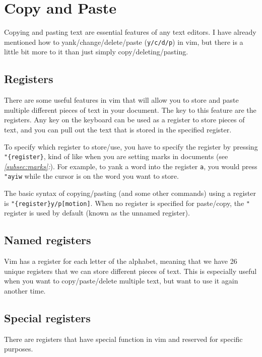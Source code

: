 \chapter{Copy and Paste}

Copying and pasting text are essential features of any text editors.
I have already mentioned how to yank/change/delete/paste (\verb|y/c/d/p|) in vim, but there is a little bit more to it than just simply copy/deleting/pasting.

\section{Registers}

There are some useful features in vim that will allow you to store and paste multiple different pieces of text in your document.
The key to this feature are the registers.
Any key on the keyboard can be used as a register to store pieces of text, and you can pull out the text that is stored in the specified register.

To specify which register to store/use, you have to specify the register by pressing \verb|"{register}|, kind of like when you are setting marks in documents (see \textit{\ref{subsec:marks}:}).
For example, to yank a word into the register \verb|a|, you would press \verb|"ayiw| while the cursor is on the word you want to store.

The basic syntax of copying/pasting (and some other commands) using a register is \verb|"{register}y/p[motion]|.
When no register is specified for paste/copy, the \verb|"| register is used by default (known as the unnamed register).

\section{Named registers}

Vim has a register for each letter of the alphabet, meaning that we have 26 unique registers that we can store different pieces of text.
This is especially useful when you want to copy/paste/delete multiple text, but want to use it again another time.

\section{Special registers}

There are registers that have special function in vim and reserved for specific purposes.


